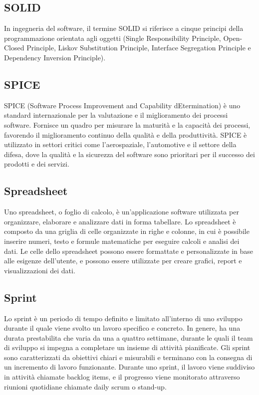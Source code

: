 \vspace{2em}
\subsection*{SOLID}
\par In ingegneria del software, il termine SOLID si riferisce a cinque principi della programmazione orientata agli oggetti (Single Responsibility Principle, Open-Closed Principle, Liskov Substitution Principle, Interface Segregation Principle e Dependency Inversion Principle).

\vspace{2em}
\subsection*{SPICE}
\par SPICE (Software Process Improvement and Capability dEtermination) è uno standard internazionale per la valutazione e il miglioramento dei processi software. Fornisce un quadro per misurare la maturità e la capacità dei processi, favorendo il miglioramento continuo della qualità e della produttività. SPICE è utilizzato in settori critici come l'aerospaziale, l'automotive e il settore della difesa, dove la qualità e la sicurezza del software sono prioritari per il successo dei prodotti e dei servizi.

\vspace{2em}
\subsection*{Spreadsheet}
\par Uno spreadsheet, o foglio di calcolo, è un'applicazione software utilizzata per organizzare, elaborare e analizzare dati in forma tabellare. Lo spreadsheet è composto da una griglia di celle organizzate in righe e colonne, in cui è possibile inserire numeri, testo e formule matematiche per eseguire calcoli e analisi dei dati. Le celle dello spreadsheet possono essere formattate e personalizzate in base alle esigenze dell'utente, e possono essere utilizzate per creare grafici, report e visualizzazioni dei dati.

\vspace{2em}
\subsection*{Sprint}
\par Lo sprint è un periodo di tempo definito e limitato all'interno di uno sviluppo  durante il quale viene svolto un lavoro specifico e concreto. In genere, ha una durata prestabilita che varia da una a quattro settimane, durante le quali il team di sviluppo si impegna a completare un insieme di attività pianificate. Gli sprint sono caratterizzati da obiettivi chiari e misurabili e terminano con la consegna di un incremento di lavoro funzionante. Durante uno sprint, il lavoro viene suddiviso in attività chiamate backlog items, e il progresso viene monitorato attraverso riunioni quotidiane chiamate daily scrum o stand-up.

